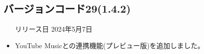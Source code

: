 \subsection*{バージョンコード29(1.4.2)}
\begin{itemize}
    \item[リリース日] 2024年5月7日
\end{itemize}

\new
\begin{itemize}
    \item YouTube Musicとの連携機能(プレビュー版)を追加しました。
\end{itemize}

\change

\fix

